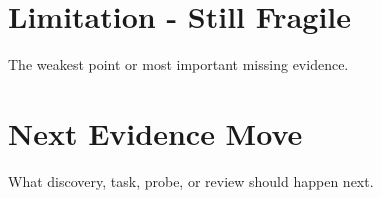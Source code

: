 \documentclass[11pt]{article}
\begin{document}
\section*{Limitation - Still Fragile}
The weakest point or most important missing evidence.

\section*{Next Evidence Move}
What discovery, task, probe, or review should happen next.
\end{document}
